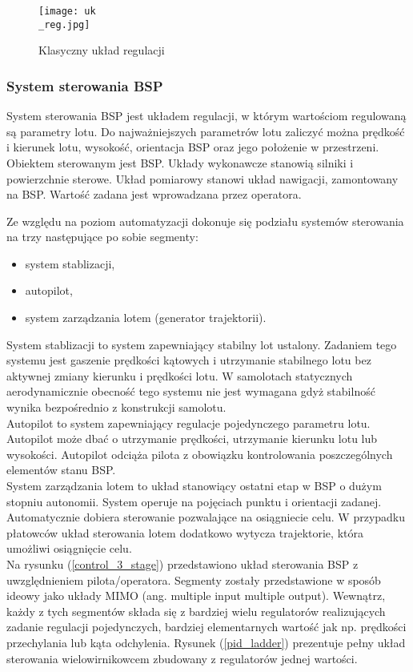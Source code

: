 \begin{figure}[!h]
   	\centering
      	\texttt{[image: uk\\\_reg.jpg]}
      	\caption{Klasyczny układ regulacji}
      	\label{reg}
\end{figure}

\subsubsection{System sterowania BSP}
System sterowania BSP jest układem regulacji, w którym wartościom regulowaną są parametry lotu. Do najważniejszych parametrów lotu zaliczyć można prędkość i kierunek lotu, wysokość, orientacja BSP oraz jego położenie w przestrzeni. Obiektem sterowanym jest BSP. Układy wykonawcze stanowią silniki i powierzchnie sterowe. Układ pomiarowy stanowi układ nawigacji, zamontowany na BSP. Wartość zadana jest wprowadzana przez operatora.

 Ze względu na poziom automatyzacji dokonuje się podziału systemów sterowania na trzy następujące po sobie segmenty:
\begin{itemize}
\item system stablizacji,
\item autopilot,
\item system zarządzania lotem (generator trajektorii).
\end{itemize}
System stablizacji to system zapewniający stabilny lot ustalony. Zadaniem tego systemu jest gaszenie prędkości kątowych i utrzymanie stabilnego lotu bez aktywnej zmiany kierunku i prędkości lotu. W samolotach statycznych aerodynamicznie obecność tego systemu nie jest wymagana gdyż stabilność wynika bezpośrednio z konstrukcji samolotu.\\

Autopilot to system zapewniający regulacje pojedynczego parametru lotu. Autopilot może dbać o utrzymanie prędkości, utrzymanie kierunku lotu lub wysokości. Autopilot odciąża pilota z obowiązku kontrolowania poszczególnych elementów stanu BSP.\\

System zarządzania lotem to układ stanowiący ostatni etap w BSP o dużym stopniu autonomii. System operuje na pojęciach punktu i orientacji zadanej. Automatycznie dobiera sterowanie pozwalające na osiągniecie celu. W przypadku płatowców układ sterowania lotem dodatkowo wytycza trajektorie, która umożliwi osiągnięcie celu.\\

Na rysunku (\ref{control_3_stage}) przedstawiono układ sterowania BSP z uwzględnieniem pilota/operatora. Segmenty zostały przedstawione w sposób ideowy jako układy MIMO (ang. multiple input multiple output). Wewnątrz, każdy z tych segmentów składa się z bardziej wielu regulatorów realizujących zadanie regulacji pojedynczych, bardziej elementarnych wartość jak np. prędkości przechylania lub kąta odchylenia. Rysunek (\ref{pid_ladder}) prezentuje pełny układ sterowania wielowirnikowcem zbudowany z regulatorów jednej wartości.\\

